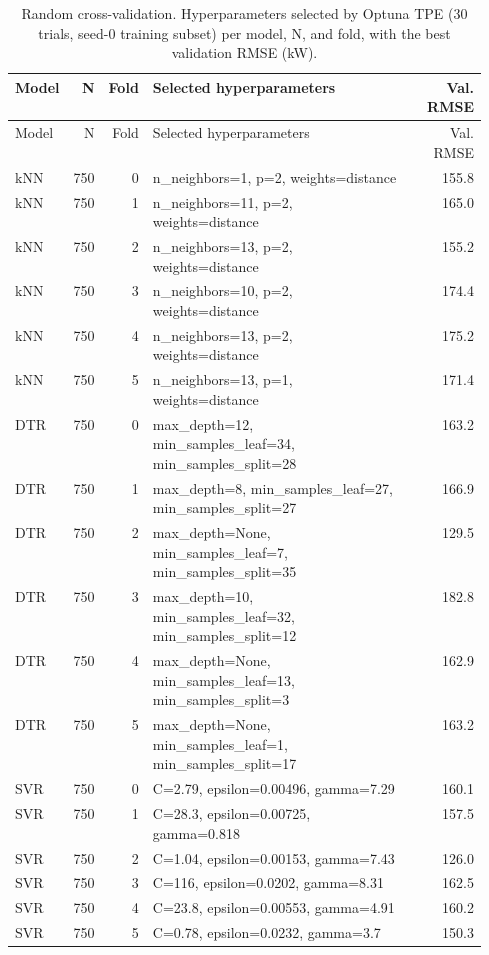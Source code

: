 \begin{longtable}{lrrp{0.55\linewidth}r}
\caption{Random cross-validation. Hyperparameters selected by Optuna TPE (30 trials, seed-0 training subset) per model, N, and fold, with the best validation RMSE (kW).}\label{tab:t7r} \\
\toprule
Model & N & Fold & Selected hyperparameters & Val. RMSE \\
\midrule
\endfirsthead
\toprule
Model & N & Fold & Selected hyperparameters & Val. RMSE \\
\midrule
\endhead
\bottomrule
\endlastfoot
kNN & 750 & 0 & n\_neighbors=1, p=2, weights=distance & 155.8 \\
kNN & 750 & 1 & n\_neighbors=11, p=2, weights=distance & 165.0 \\
kNN & 750 & 2 & n\_neighbors=13, p=2, weights=distance & 155.2 \\
kNN & 750 & 3 & n\_neighbors=10, p=2, weights=distance & 174.4 \\
kNN & 750 & 4 & n\_neighbors=13, p=2, weights=distance & 175.2 \\
kNN & 750 & 5 & n\_neighbors=13, p=1, weights=distance & 171.4 \\
DTR & 750 & 0 & max\_depth=12, min\_samples\_leaf=34, min\_samples\_split=28 & 163.2 \\
DTR & 750 & 1 & max\_depth=8, min\_samples\_leaf=27, min\_samples\_split=27 & 166.9 \\
DTR & 750 & 2 & max\_depth=None, min\_samples\_leaf=7, min\_samples\_split=35 & 129.5 \\
DTR & 750 & 3 & max\_depth=10, min\_samples\_leaf=32, min\_samples\_split=12 & 182.8 \\
DTR & 750 & 4 & max\_depth=None, min\_samples\_leaf=13, min\_samples\_split=3 & 162.9 \\
DTR & 750 & 5 & max\_depth=None, min\_samples\_leaf=1, min\_samples\_split=17 & 163.2 \\
SVR & 750 & 0 & C=2.79, epsilon=0.00496, gamma=7.29 & 160.1 \\
SVR & 750 & 1 & C=28.3, epsilon=0.00725, gamma=0.818 & 157.5 \\
SVR & 750 & 2 & C=1.04, epsilon=0.00153, gamma=7.43 & 126.0 \\
SVR & 750 & 3 & C=116, epsilon=0.0202, gamma=8.31 & 162.5 \\
SVR & 750 & 4 & C=23.8, epsilon=0.00553, gamma=4.91 & 160.2 \\
SVR & 750 & 5 & C=0.78, epsilon=0.0232, gamma=3.7 & 150.3 \\

\end{longtable}
